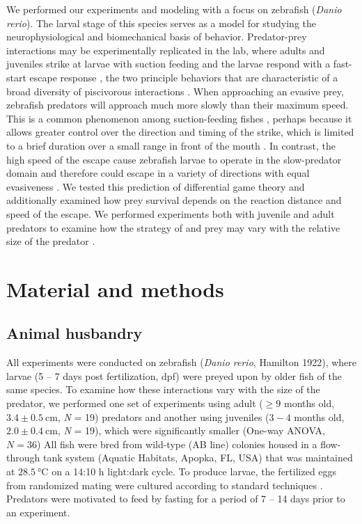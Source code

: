 \documentclass[]{rsos}%
\begin{document}
We performed our experiments and modeling with a focus on zebrafish (\textit{Danio rerio}). 
The larval stage of this species serves as a model for studying the neurophysiological \cite{Bianco:2015gm,Bagnall:2014iu,Huang:2013vj} and biomechanical \cite{Muller:2004hp,Li:2016cy} basis of behavior.
Predator-prey interactions may be experimentally replicated in the lab, where adults and juveniles strike at larvae with suction feeding and the larvae respond with a fast-start escape response \cite{Stewart:2013bha}, the two principle behaviors that are characteristic of a broad diversity of piscivorous interactions \cite{Weihs:1984tb,Walker:2005vn,Higham:2007go,Higham:2005iu}. 
When approaching an evasive prey, zebrafish predators will approach much more slowly than their maximum speed.
This is a common phenomenon among suction-feeding fishes \cite{Higham:2005iu,Higham:2007go}, perhaps because it allows greater control over the direction and timing of the strike, which is limited to a brief duration over a small range in front of the mouth \cite{Holzman:2008jc,Holzman:2009uu}. 
In contrast, the high speed of the escape cause zebrafish larvae to operate in the slow-predator domain and therefore could escape in a variety of directions with equal evasiveness \cite{Soto:2015cj}.
We tested this prediction of differential game theory and additionally examined how prey survival depends on the reaction distance and speed of the escape.  
We performed experiments both with juvenile and adult predators to examine how the strategy of and prey may vary with the relative size of the predator \cite{Fuiman:1994td}.


\section{Material and methods}

\subsection{Animal husbandry}
All experiments were conducted on zebrafish (\textit{Danio rerio}, Hamilton 1922), where larvae (5 -- 7 days post fertilization, dpf) were preyed upon by older fish of the same species. 
To examine how these interactions vary with the size of the predator, we performed one set of experiments using adult ($\geq 9$ months old, $3.4 \pm \SI{0.5}{\cm}$, \textit{N} = 19) predators and another using juveniles ($3-4$ months old, $2.0  \pm  \SI{0.4}{\cm}$, \textit{N} = 19), which were significantly smaller (One-way ANOVA, $\textit{N} = 36$)
All fish were bred from wild-type (AB line) colonies housed in a flow-through tank system (Aquatic Habitats, Apopka, FL, USA) that was maintained at $\SI{28.5}{\celsius}$ on a 14:10 h light:dark cycle. 
To produce larvae, the fertilized eggs from randomized mating were cultured according to standard techniques \cite{Westerfield:UXiBrEuA}.
Predators were motivated to feed by fasting for a period of 7 -- 14 days prior to an experiment.
\end{document}
